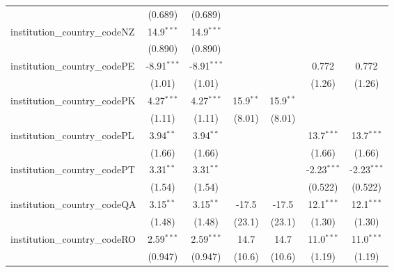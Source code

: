 \begin{tabular}{lcccccc}
                                         & (0.689)        & (0.689)        &               &               &               &   \\   
   institution\_country\_codeNZ          & 14.9$^{***}$   & 14.9$^{***}$   &               &               &               &   \\   
                                         & (0.890)        & (0.890)        &               &               &               &   \\   
   institution\_country\_codePE          & -8.91$^{***}$  & -8.91$^{***}$  &               &               & 0.772         & 0.772\\   
                                         & (1.01)         & (1.01)         &               &               & (1.26)        & (1.26)\\   
   institution\_country\_codePK          & 4.27$^{***}$   & 4.27$^{***}$   & 15.9$^{**}$   & 15.9$^{**}$   &               &   \\   
                                         & (1.11)         & (1.11)         & (8.01)        & (8.01)        &               &   \\   
   institution\_country\_codePL          & 3.94$^{**}$    & 3.94$^{**}$    &               &               & 13.7$^{***}$  & 13.7$^{***}$\\   
                                         & (1.66)         & (1.66)         &               &               & (1.66)        & (1.66)\\   
   institution\_country\_codePT          & 3.31$^{**}$    & 3.31$^{**}$    &               &               & -2.23$^{***}$ & -2.23$^{***}$\\   
                                         & (1.54)         & (1.54)         &               &               & (0.522)       & (0.522)\\   
   institution\_country\_codeQA          & 3.15$^{**}$    & 3.15$^{**}$    & -17.5         & -17.5         & 12.1$^{***}$  & 12.1$^{***}$\\   
                                         & (1.48)         & (1.48)         & (23.1)        & (23.1)        & (1.30)        & (1.30)\\   
   institution\_country\_codeRO          & 2.59$^{***}$   & 2.59$^{***}$   & 14.7          & 14.7          & 11.0$^{***}$  & 11.0$^{***}$\\   
                                         & (0.947)        & (0.947)        & (10.6)        & (10.6)        & (1.19)        & (1.19)\\   

\end{tabular}
